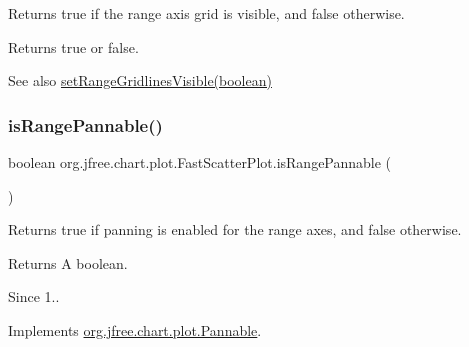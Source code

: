 Returns {\ttfamily true} if the range axis grid is visible, and {\ttfamily false} otherwise.

\begin{DoxyReturn}{Returns}
{\ttfamily true} or {\ttfamily false}.
\end{DoxyReturn}
\begin{DoxySeeAlso}{See also}
\mbox{\hyperlink{classorg_1_1jfree_1_1chart_1_1plot_1_1_fast_scatter_plot_a4c138745182ea476a64eacb632b5af6c}{set\+Range\+Gridlines\+Visible(boolean)}} 
\end{DoxySeeAlso}
\mbox{\label{classorg_1_1jfree_1_1chart_1_1plot_1_1_fast_scatter_plot_a3a191cded96725f3dfe473c288d96e91}} 
\subsubsection{\texorpdfstring{is\+Range\+Pannable()}{isRangePannable()}}
{\footnotesize\ttfamily boolean org.\+jfree.\+chart.\+plot.\+Fast\+Scatter\+Plot.\+is\+Range\+Pannable (\begin{DoxyParamCaption}{ }\end{DoxyParamCaption})}

Returns {\ttfamily true} if panning is enabled for the range axes, and {\ttfamily false} otherwise.

\begin{DoxyReturn}{Returns}
A boolean.
\end{DoxyReturn}
\begin{DoxySince}{Since}
1.. 
\end{DoxySince}


Implements \mbox{\hyperlink{interfaceorg_1_1jfree_1_1chart_1_1plot_1_1_pannable_ad1e4f1dde36baf9964ac14654aab4f8e}{org.\+jfree.\+chart.\+plot.\+Pannable}}.

\mbox{\label{classorg_1_1jfree_1_1chart_1_1plot_1_1_fast_scatter_plot_a3508600766d21adb9a8aa2a8fe121d71}} 
